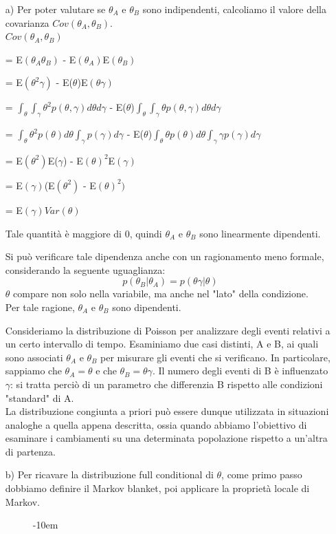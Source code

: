 \begin{enumerate}
\item [a)] Per poter valutare se $\theta_A$ e $\theta_B$ sono indipendenti, calcoliamo il valore della covarianza $Cov(\theta_A, \theta_B)$.\\

$Cov(\theta_A, \theta_B)$

= E$(\theta_A\theta_B)$ - E$(\theta_A)$E$(\theta_B)$

= E$(\theta^2\gamma)$ - E($\theta$)E$(\theta\gamma)$

= $\int_\theta \int_\gamma \theta^2 p(\theta,\gamma) d\theta d\gamma$ - E($\theta$)$\int_\theta \int_\gamma \theta p(\theta,\gamma) d\theta d\gamma$

= $\int_\theta \theta^2 p(\theta)d\theta \int_\gamma p(\gamma)d\gamma $ - E($\theta$)$\int_\theta \theta p(\theta)d\theta \int_\gamma \gamma p(\gamma)d\gamma$ 

= E$(\theta^2)$E($\gamma$) - E$(\theta)^2$E$(\gamma)$ 

= E$(\gamma)$(E$(\theta^2)$ - E$(\theta)^2)$

= E$(\gamma)Var(\theta)$

Tale quantità è maggiore di 0, quindi $\theta_A$ e $\theta_B$ sono linearmente dipendenti.

Si può verificare tale dipendenza anche con un ragionamento meno formale, considerando la seguente uguaglianza:
$$p(\theta_B|\theta_A)=p(\theta\gamma|\theta)$$
$\theta$ compare non solo nella variabile, ma anche nel "lato" della condizione.\\
Per tale ragione, $\theta_A$ e $\theta_B$ sono dipendenti.

Consideriamo la distribuzione di Poisson per analizzare degli eventi relativi a un certo intervallo di tempo. 
Esaminiamo due casi distinti, A e B, ai quali sono associati $\theta_A$ e $\theta_B$ 
per misurare gli eventi che si verificano. In particolare, sappiamo che 
$\theta_A = \theta$ e che $\theta_B = \theta\gamma$.
Il numero degli eventi di B è influenzato $\gamma$: si tratta perciò di un parametro che differenzia B rispetto alle condizioni "standard" di A.\\
La distribuzione congiunta a priori può essere dunque utilizzata in situazioni analoghe a quella appena descritta, ossia quando abbiamo l'obiettivo di esaminare i cambiamenti su una determinata popolazione rispetto a un'altra di partenza.

\item [b)]
Per ricavare la distribuzione full conditional di $\theta$, come primo passo dobbiamo definire il Markov blanket, poi applicare la proprietà locale di Markov.
\begin{figure}
  \begin{adjustwidth}{}{-10em} 
    \begin{tikzpicture}[
      > = stealth, %
      shorten > = 1pt, %
      auto,
      node distance = 3cm, %
      semithick
    ]
    

\end{tikzpicture}
\end{adjustwidth}
\end{figure}
\end{enumerate}
